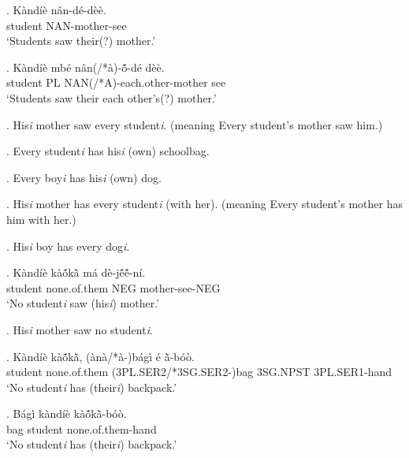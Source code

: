 \documentclass{assets/fieldnotes}
\begin{document}

\exg. K\`{a}nd\'{i}\`{e} n\^{a}n-d\'{e}-d\`{e}\`{e}. \\
student NAN-mother-see \\
`Students saw their(?) mother.' 


\exg.  K\`{a}nd\'{i}\`{e} mb\'{e} n\^{a}n(/*\`{a})-\textipa{\textltailn}ṍ-d\'{e} d\`{e}\`{e}. \\ 
student PL NAN(/*A)-each.other-mother see \\
`Students saw their each other's(?) mother.' 

\ex. His\textit{\scriptsize{i}} mother saw every student\textit{\scriptsize{i}}. (meaning Every student's mother saw him.)

\ex. Every student\textit{\scriptsize{i}} has his\textit{\scriptsize{i}} (own) schoolbag.

\ex. Every boy\textit{\scriptsize{i}} has his\textit{\scriptsize{i}} (own) dog.

\ex. His\textit{\scriptsize{i}} mother has every student\textit{\scriptsize{i}} (with her). (meaning Every student's mother has him with her.) 

\ex. His\textit{\scriptsize{i}} boy has every dog\textit{\scriptsize{i}}. 

\exg. K\`{a}nd\'{i}\`{e} k\`{a}ṍkã̀ m\'{a} d\`{e}-jẽ́ẽ́-n\'{i}. \\
student none.of.them NEG mother-see-NEG \\
`No student\textit{\scriptsize{i}} saw (his\textit{\scriptsize{i}}) mother.' 

\ex. His\textit{\scriptsize{i}} mother saw no student\textit{\scriptsize{i}}.

\exg. K\`{a}nd\'{i}\`{e} k\`{a}ṍkã̀, (\`{a}n\`{a}/*\`{a}-)b\'{a}g\`{i} \'{e} ã̀-b\'{o}\`{o}. \\
student none.of.them (3PL.SER2/*3SG.SER2-)bag 3SG.NPST 3PL.SER1-hand \\
`No student\textit{\scriptsize{i}} has (their\textit{\scriptsize{i}}) backpack.'

\exg. B\'{a}g\`{i} k\`{a}nd\'{i}\`{e} k\`{a}ṍkã̀-b\'{o}\`{o}. \\
bag student none.of.them-hand \\
`No student\textit{\scriptsize{i}} has (their\textit{\scriptsize{i}}) backpack.' 
\end{document}
